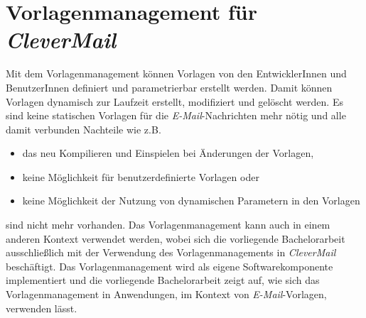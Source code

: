 \section{Vorlagenmanagement für \emph{CleverMail}}
Mit dem Vorlagenmanagement können Vorlagen von den EntwicklerInnen und BenutzerInnen definiert und parametrierbar erstellt werden. Damit können Vorlagen dynamisch zur Laufzeit erstellt, modifiziert und gelöscht werden. Es sind keine statischen Vorlagen für die \emph{E-Mail}-Nachrichten mehr nötig und alle damit verbunden Nachteile wie z.B. 
\begin{itemize}
	\item das neu Kompilieren und Einspielen bei Änderungen der Vorlagen,
	\item keine Möglichkeit für benutzerdefinierte Vorlagen oder
	\item keine Möglichkeit der Nutzung von dynamischen Parametern in den Vorlagen 
\end{itemize}
sind nicht mehr vorhanden. 
\newline
\newline
Das Vorlagenmanagement kann auch in einem anderen Kontext verwendet werden, wobei sich die vorliegende Bachelorarbeit ausschließlich mit der Verwendung des Vorlagenmanagements in \emph{CleverMail} beschäftigt. Das Vorlagenmanagement wird als eigene Softwarekomponente implementiert und die vorliegende Bachelorarbeit zeigt auf, wie sich das Vorlagenmanagement in Anwendungen, im Kontext von \emph{E-Mail}-Vorlagen, verwenden lässt. 
\newpage

